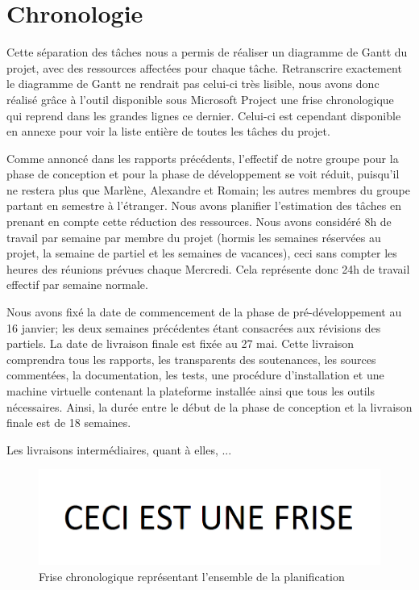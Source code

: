 \section{Chronologie}
\label{sec:chronologie}

	Cette séparation des tâches nous a permis de réaliser un diagramme de Gantt du projet, avec des ressources affectées pour chaque tâche. Retranscrire exactement le diagramme de Gantt ne rendrait pas celui-ci très lisible, nous avons donc réalisé grâce à l'outil disponible sous Microsoft Project une frise chronologique qui reprend dans les grandes lignes ce dernier. Celui-ci est cependant disponible en annexe pour voir la liste entière de toutes les tâches du projet.

	Comme annoncé dans les rapports précédents, l'effectif de notre groupe pour la phase de conception et pour la phase de développement se voit réduit, puisqu'il ne restera plus que Marlène, Alexandre et Romain; les autres membres du groupe partant en semestre à l'étranger. Nous avons planifier l'estimation des tâches en prenant en compte cette réduction des ressources. Nous avons considéré 8h de travail par semaine par membre du projet (hormis les semaines réservées au projet, la semaine de partiel et les semaines de vacances), ceci sans compter les heures des réunions prévues chaque Mercredi. Cela représente donc 24h de travail effectif par semaine normale.

	Nous avons fixé la date de commencement de la phase de pré-développement au 16 janvier; les deux semaines précédentes étant consacrées aux révisions des partiels. La date de livraison finale est fixée au 27 mai. Cette livraison comprendra tous les rapports, les transparents des soutenances, les sources commentées, la documentation, les tests, une procédure d'installation et une machine virtuelle contenant la plateforme installée ainsi que tous les outils nécessaires. Ainsi, la durée entre le début de la phase de conception et la livraison finale est de 18 semaines.

	Les livraisons intermédiaires, quant à elles, ...



	\begin{figure}[H]
        \centering
        \includegraphics[width=1.3\textwidth, angle=90]{figure/frise.png}
            \caption{Frise chronologique représentant l'ensemble de la planification}
            \label{fig:frise}
    \end{figure}